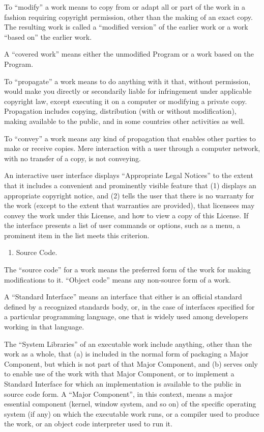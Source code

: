 \documentclass[letterpaper,10pt,english]{sphinxmanual}
\begin{document}
To “modify” a work means to copy from or adapt all or part of the work
in a fashion requiring copyright permission, other than the making of an
exact copy.  The resulting work is called a “modified version” of the
earlier work or a work “based on” the earlier work.

A “covered work” means either the unmodified Program or a work based
on the Program.

To “propagate” a work means to do anything with it that, without
permission, would make you directly or secondarily liable for
infringement under applicable copyright law, except executing it on a
computer or modifying a private copy.  Propagation includes copying,
distribution (with or without modification), making available to the
public, and in some countries other activities as well.

To “convey” a work means any kind of propagation that enables other
parties to make or receive copies.  Mere interaction with a user through
a computer network, with no transfer of a copy, is not conveying.

An interactive user interface displays “Appropriate Legal Notices”
to the extent that it includes a convenient and prominently visible
feature that (1) displays an appropriate copyright notice, and (2)
tells the user that there is no warranty for the work (except to the
extent that warranties are provided), that licensees may convey the
work under this License, and how to view a copy of this License.  If
the interface presents a list of user commands or options, such as a
menu, a prominent item in the list meets this criterion.
\begin{enumerate}
%
\item {} 
Source Code.

\end{enumerate}

The “source code” for a work means the preferred form of the work
for making modifications to it.  “Object code” means any non-source
form of a work.

A “Standard Interface” means an interface that either is an official
standard defined by a recognized standards body, or, in the case of
interfaces specified for a particular programming language, one that
is widely used among developers working in that language.

The “System Libraries” of an executable work include anything, other
than the work as a whole, that (a) is included in the normal form of
packaging a Major Component, but which is not part of that Major
Component, and (b) serves only to enable use of the work with that
Major Component, or to implement a Standard Interface for which an
implementation is available to the public in source code form.  A
“Major Component”, in this context, means a major essential component
(kernel, window system, and so on) of the specific operating system
(if any) on which the executable work runs, or a compiler used to
produce the work, or an object code interpreter used to run it.
\end{document}
